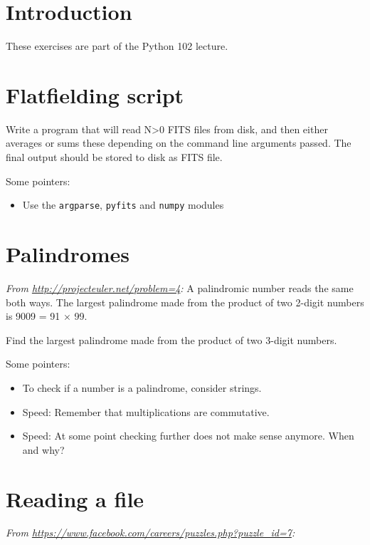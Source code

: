 \documentclass[draft=false]{article}
\def\pythoni{\lstinline[language=pythontim]}
\begin{document}
\thispagestyle{empty}


\section*{Introduction}

These exercises are part of the Python 102 lecture.

\section{Flatfielding script}

Write a program that will read N>0 FITS files from disk, and then either 
averages or sums these depending on the command line arguments passed. The 
final output should be stored to disk as FITS file.

Some pointers:

\begin{itemize}
	\item Use the \pythoni{argparse}, \pythoni{pyfits} and \pythoni{numpy} modules
\end{itemize}

\section{Palindromes}

\emph{From \url{http://projecteuler.net/problem=4}:}
A palindromic number reads the same both ways. The largest palindrome made from the product of two 2-digit numbers is 9009 = 91 × 99.

Find the largest palindrome made from the product of two 3-digit numbers.

Some pointers:

\begin{itemize}
	\item To check if a number is a palindrome, consider strings.
	\item Speed: Remember that multiplications are commutative.
	\item Speed: At some point checking further does not make sense anymore. When and why?
\end{itemize}

\section{Reading a file}
\emph{From \url{https://www.facebook.com/careers/puzzles.php?puzzle_id=7}:}
\end{document}
